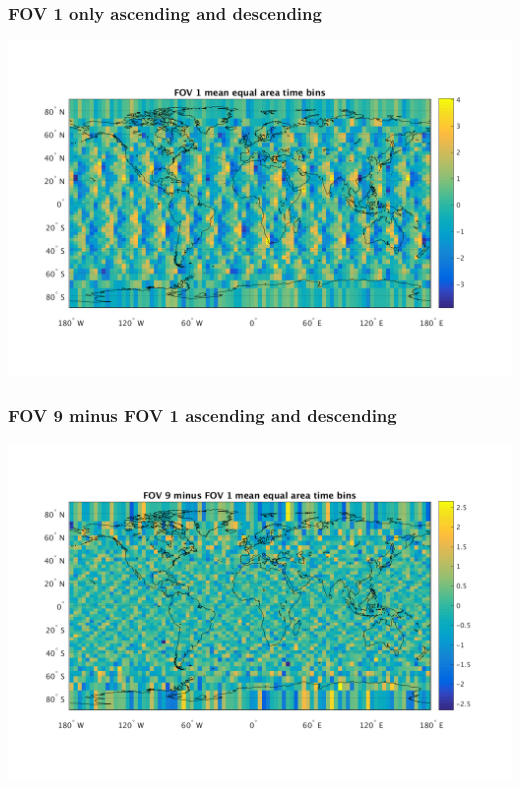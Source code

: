 \documentclass[11pt]{beamer}
\begin{document}
\begin{frame}
\frametitle{FOV 1 only ascending and descending}
\begin{center}
  \includegraphics[scale=0.5]{slackfigs/near_nadir_FOv_1_only.png}
\end{center}
\end{frame} %
\begin{frame}
\frametitle{FOV 9 minus FOV 1 ascending and descending}
\begin{center}
  \includegraphics[scale=0.5]{slackfigs/near_nadir_FOv_1_minus_9.png}
\end{center}
\end{frame} %
\end{document}
